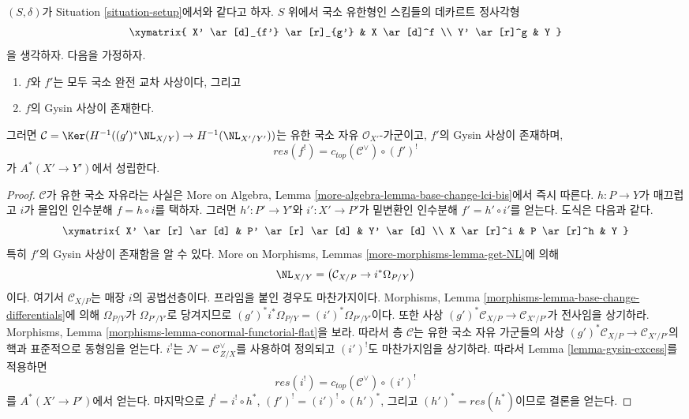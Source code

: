 \begin{lemma}
\label{lemma-compare-gysin-base-change}
$(S, \delta)$가 Situation \ref{situation-setup}에서와 같다고 하자.
$S$ 위에서 국소 유한형인 스킴들의 데카르트 정사각형
$$
\xymatrix{
X' \ar[d]_{f'} \ar[r]_{g'} &
X \ar[d]^f \\
Y' \ar[r]^g &
Y
}
$$
을 생각하자. 다음을 가정하자.
\begin{enumerate}
\item $f$와 $f'$는 모두 국소 완전 교차 사상이다, 그리고
\item $f$의 Gysin 사상이 존재한다.
\end{enumerate}
그러면 $\mathcal{C} = \Ker(H^{-1}((g')^*\NL_{X/Y}) \to H^{-1}(\NL_{X'/Y'}))$는
유한 국소 자유 $\mathcal{O}_{X'}$-가군이고, $f'$의 Gysin 사상이
존재하며,
$$
res(f^!) = c_{top}(\mathcal{C}^\vee) \circ (f')^!
$$
가 $A^*(X' \to Y')$에서 성립한다.
\end{lemma}

\begin{proof}
$\mathcal{C}$가 유한 국소 자유라는 사실은 More on Algebra, Lemma
\ref{more-algebra-lemma-base-change-lci-bis}에서 즉시 따른다.
$h : P \to Y$가 매끄럽고 $i$가 몰입인 인수분해 $f = h \circ i$를
택하자. 그러면 $h' : P' \to Y'$와 $i' : X' \to P'$가 밑변환인
인수분해 $f' = h' \circ i'$를 얻는다. 도식은 다음과 같다.
$$
\xymatrix{
X' \ar[r] \ar[d] &
P' \ar[r] \ar[d] &
Y' \ar[d] \\
X \ar[r]^i &
P \ar[r]^h &
Y
}
$$
특히 $f'$의 Gysin 사상이 존재함을 알 수 있다. More on Morphisms,
Lemmas \ref{more-morphisms-lemma-get-NL}에 의해
$$
\NL_{X/Y} = \left( \mathcal{C}_{X/P} \to i^*\Omega_{P/Y} \right)
$$
이다. 여기서 $\mathcal{C}_{X/P}$는 매장 $i$의 공법선층이다. 프라임을
붙인 경우도 마찬가지이다. Morphisms, Lemma
\ref{morphisms-lemma-base-change-differentials}에 의해
$\Omega_{P/Y}$가 $\Omega_{P'/Y'}$로 당겨지므로
$(g')^*i^*\Omega_{P/Y} = (i')^*\Omega_{P'/Y'}$이다. 또한 사상
$(g')^*\mathcal{C}_{X/P} \to \mathcal{C}_{X'/P'}$가 전사임을 상기하라.
Morphisms, Lemma \ref{morphisms-lemma-conormal-functorial-flat}을 보라.
따라서 층 $\mathcal{C}$는 유한 국소 자유 가군들의 사상
$(g')^*\mathcal{C}_{X/P} \to \mathcal{C}_{X'/P'}$의 핵과 표준적으로
동형임을 얻는다. $i^!$는 $\mathcal{N} = \mathcal{C}_{Z/X}^\vee$를
사용하여 정의되고 $(i')^!$도 마찬가지임을 상기하라. 따라서 Lemma
\ref{lemma-gysin-excess}를 적용하면
$$
res(i^!) = c_{top}(\mathcal{C}^\vee) \circ (i')^!
$$
를 $A^*(X' \to P')$에서 얻는다. 마지막으로
$f^! = i^! \circ h^*$, $(f')^! = (i')^! \circ (h')^*$, 그리고
$(h')^* = res(h^*)$이므로 결론을 얻는다.
\end{proof}

